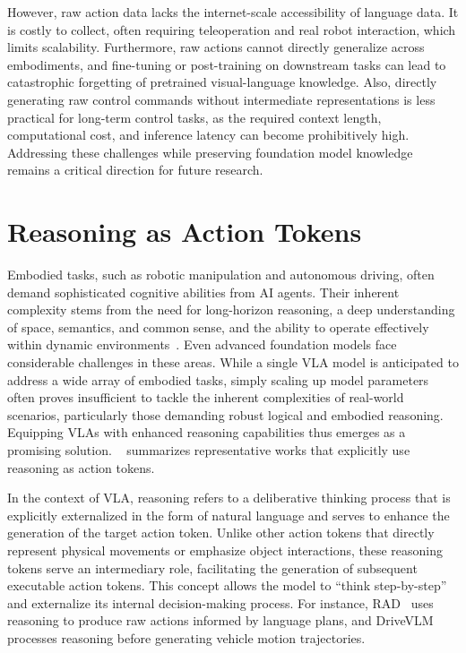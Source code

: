 \documentclass[10pt, a4paper, logo, copyright]{googledeepmind} %
\begin{document}
However, raw action data lacks the internet-scale accessibility of language data. It is costly to collect, often requiring teleoperation and real robot interaction, which limits scalability. Furthermore, raw actions cannot directly generalize across embodiments, and fine-tuning or post-training on downstream tasks can lead to catastrophic forgetting of pretrained visual-language knowledge. Also, directly generating raw control commands without intermediate representations is less practical for long-term control tasks, as the required context length, computational cost, and inference latency can become prohibitively high.
Addressing these challenges while preserving foundation model knowledge remains a critical direction for future research.

\section{Reasoning as Action Tokens}

\label{sec:reasoning}


Embodied tasks, such as robotic manipulation and autonomous driving, often demand sophisticated cognitive abilities from AI agents. Their inherent complexity stems from the need for long-horizon reasoning, a deep understanding of space, semantics, and common sense, and the ability to operate effectively within dynamic environments~\citep{zhang2024vlabench}. Even advanced foundation models face considerable challenges in these areas. While a single VLA model is anticipated to address a wide array of embodied tasks, simply scaling up model parameters often proves insufficient to tackle the inherent complexities of real-world scenarios, particularly those demanding robust logical and embodied reasoning. Equipping VLAs with enhanced reasoning capabilities thus emerges as a promising solution. ~ summarizes  representative works that explicitly use reasoning as action tokens.


In the context of VLA, reasoning refers to a deliberative thinking process that is explicitly externalized in the form of natural language and serves to enhance the generation of the target action token. Unlike other action tokens that directly represent physical movements or emphasize object interactions, these reasoning tokens serve an intermediary role, facilitating the generation of subsequent executable action tokens. This concept allows the model to ``think step-by-step'' and externalize its internal decision-making process. For instance, RAD~\cite{clark2025action} uses reasoning to produce raw actions informed by language plans, and DriveVLM~\cite{tian2024drivevlm} processes reasoning before generating vehicle motion trajectories. 
\end{document}
